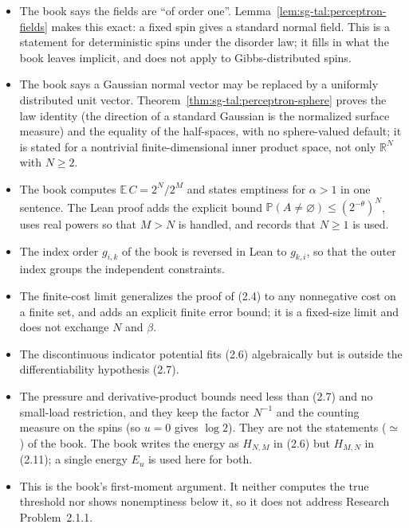 \begin{remark}\label{rem:sg-tal:perceptron-comparison}
\begin{itemize}
\item The book says the fields are ``of order one''. Lemma~\ref{lem:sg-tal:perceptron-fields} makes this exact:
a fixed spin gives a standard normal field. This is a statement for deterministic spins under the disorder
law; it fills in what the book leaves implicit, and does not apply to Gibbs-distributed spins.
\item The book says a Gaussian normal vector may be replaced by a uniformly distributed unit vector. Theorem~\ref{thm:sg-tal:perceptron-sphere}
proves the law identity (the direction of a standard Gaussian is the normalized surface measure) and the
equality of the half-spaces, with no sphere-valued default; it is stated for a nontrivial finite-dimensional
inner product space, not only $\mathbb R^N$ with $N\ge2$.
\item The book computes $\mathbb E\,C=2^N/2^M$ and states emptiness for $\alpha>1$ in one sentence. The Lean
proof adds the explicit bound $\mathbb P(A\ne\varnothing)\le(2^{-\theta})^N$, uses real powers so that $M>N$ is
handled, and records that $N\ge1$ is used.
\item The index order $g_{i,k}$ of the book is reversed in Lean to $g_{k,i}$, so that the outer index
groups the independent constraints.
\item The finite-cost limit generalizes the proof of (2.4) to any nonnegative cost on a finite set, and adds an
explicit finite error bound; it is a fixed-size limit and does not exchange $N$ and $\beta$.
\item The discontinuous indicator potential fits (2.6) algebraically but is outside the differentiability
hypothesis (2.7).
\item The pressure and derivative-product bounds need less than (2.7) and no small-load restriction, and they
keep the factor $N^{-1}$ and the counting measure on the spins (so $u=0$ gives $\log2$). They are not the
statements ($\simeq$) of the book. The book writes the energy as $H_{N,M}$ in (2.6) but $H_{M,N}$ in (2.11); a
single energy $E_u$ is used here for both.
\item This is the book's first-moment argument. It neither computes the true threshold nor shows
nonemptiness below it, so it does not address Research Problem~2.1.1.
\end{itemize}
\end{remark}


